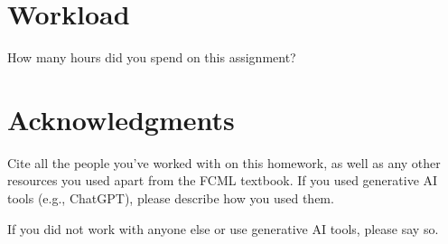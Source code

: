 \documentclass[11pt]{article}
\begin{document}
\section{Workload}

How many hours did you spend on this assignment?

\section*{Acknowledgments}

Cite all the people you've worked with on this homework, as well as any other
resources you used apart from the FCML textbook. If you used generative AI
tools (e.g., ChatGPT), please describe how you used them.

If you did not work with anyone else or use generative AI tools, please say so.
\end{document}
